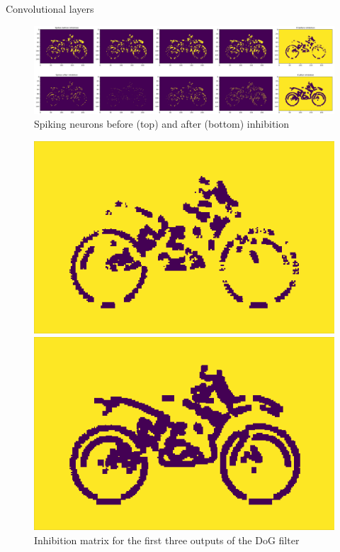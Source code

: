 \documentclass[10pt]{beamer}
\begin{document}
\begin{frame}{Convolutional layers}

\begin{figure}[h]
	\centering
	\caption{Spiking neurons before (top) and after (bottom) inhibition}
	\includegraphics[width=\textwidth]{images/S_K_values_slice2_cut}
\end{figure}
\begin{figure}[h]
	\centering
	\caption{Inhibition matrix for the first three outputs of the DoG filter}
	\begin{minipage}[b]{0.3\textwidth}
		\includegraphics[width=\textwidth]{images/K_1}
	\end{minipage}
	\hfill
	\begin{minipage}[b]{0.3\textwidth}
		\includegraphics[width=\textwidth]{images/K_2}

\end{minipage}
\end{figure}
\end{frame}
\end{document}
